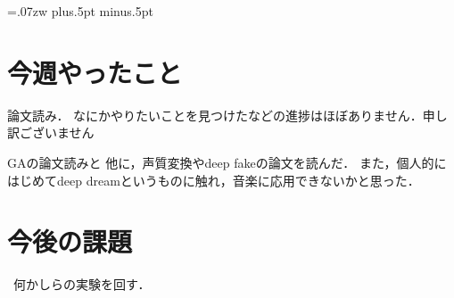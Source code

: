 \setlength{\topmargin}{-45pt}
\setlength{\oddsidemargin}{-7.5mm}
\setlength{\textheight}{24.1cm}
\setlength{\textwidth}{17.4cm}
\setlength{\columnsep}{11mm}

\kanjiskip=.07zw plus.5pt minus.5pt




\usepackage[dvipdfmx]{graphicx}   %
\usepackage[subrefformat=parens]{subcaption}




\section{今週やったこと}
 論文読み．
なにかやりたいことを見つけたなどの進捗はほぼありません．申し訳ございません

GA\cite{aggarwal2020real}の論文読みと
他に，声質変換\cite{du2020effective}やdeep fake\cite{agarwal2020detecting}の論文を読んだ．
また，個人的にはじめてdeep dreamというものに触れ，音楽に応用できないかと思った．

\section{今後の課題}
\ 何かしらの実験を回す．






